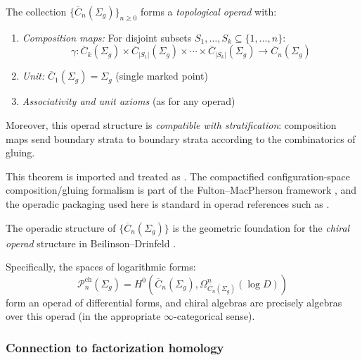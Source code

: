 \begin{theorem}\label{thm:FM-operad}
The collection $\{\overline{C}_n(\Sigma_g)\}_{n \geq 0}$ forms a \emph{topological operad} with:

\begin{enumerate}
\item \emph{Composition maps:} For disjoint subsets $S_1, \ldots, S_k \subseteq \{1,\ldots,n\}$:
\[\gamma: \overline{C}_k(\Sigma_g) \times \overline{C}_{|S_1|}(\Sigma_g) \times \cdots \times \overline{C}_{|S_k|}(\Sigma_g) \to \overline{C}_n(\Sigma_g)\]

\item \emph{Unit:} $\overline{C}_1(\Sigma_g) = \Sigma_g$ (single marked point)

\item \emph{Associativity and unit axioms} (as for any operad)
\end{enumerate}

Moreover, this operad structure is \emph{compatible with stratification}: composition maps send boundary strata to boundary strata according to the combinatorics of gluing.
\end{theorem}

\begin{remark}
This theorem is imported and treated as \ClaimStatusProvedElsewhere. The
compactified configuration-space composition/gluing formalism is part of the
Fulton--MacPherson framework \cite{FM94}, and the operadic packaging used here
is standard in operad references such as \cite{LV12}.
\end{remark}

\begin{remark}\label{rem:chiral-operad}
The operadic structure of $\{\overline{C}_n(\Sigma_g)\}$ is the geometric foundation for the \emph{chiral operad} structure in Beilinson--Drinfeld \cite{BD04}.

Specifically, the spaces of logarithmic forms:
\[\mathcal{P}^{\text{ch}}_n(\Sigma_g) = H^0(\overline{C}_n(\Sigma_g), \Omega^n_{\overline{C}_n(\Sigma_g)}(\log D))\]
form an operad of differential forms, and chiral algebras are precisely algebras over this operad (in the appropriate $\infty$-categorical sense).
\end{remark}

\subsubsection{Connection to factorization homology}

